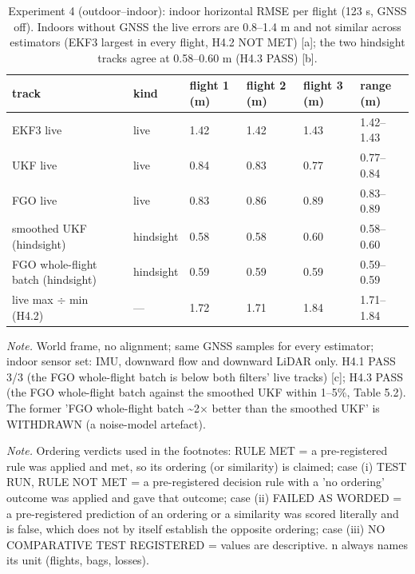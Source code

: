 \begin{table}[htbp]
\centering
\footnotesize
\caption{Experiment 4 (outdoor--indoor): indoor horizontal RMSE per flight (123 s, GNSS off). Indoors without GNSS the live errors are 0.8--1.4 m and not similar across estimators (EKF3 largest in every flight, H4.2 NOT MET) [a]; the two hindsight tracks agree at 0.58--0.60 m (H4.3 PASS) [b].}
\label{tab:T6}
\begin{tabular}{p{}p{}p{}p{}p{}p{}}
\toprule
\textbf{track} & \textbf{kind} & \textbf{flight 1 (m)} & \textbf{flight 2 (m)} & \textbf{flight 3 (m)} & \textbf{range (m)} \\
\midrule
EKF3 live & live & 1.42 & 1.42 & 1.43 & 1.42--1.43 \\
UKF live & live & 0.84 & 0.83 & 0.77 & 0.77--0.84 \\
FGO live & live & 0.83 & 0.86 & 0.89 & 0.83--0.89 \\
smoothed UKF (hindsight) & hindsight & 0.58 & 0.58 & 0.60 & 0.58--0.60 \\
FGO whole-flight batch (hindsight) & hindsight & 0.59 & 0.59 & 0.59 & 0.59--0.59 \\
live max $\div$ min (H4.2) & --- & 1.72 & 1.71 & 1.84 & 1.71--1.84 \\
\bottomrule
\end{tabular}
\par\smallskip\raggedright
\textit{Note.} World frame, no alignment; same GNSS samples for every estimator; indoor sensor set: IMU, downward flow and downward LiDAR only. H4.1 PASS 3/3 (the FGO whole-flight batch is below both filters' live tracks) [c]; H4.3 PASS (the FGO whole-flight batch against the smoothed UKF within 1--5\%, Table 5.2). The former 'FGO whole-flight batch \textasciitilde{}2$\times$ better than the smoothed UKF' is WITHDRAWN (a noise-model artefact).\par
\textit{Note.} Ordering verdicts used in the footnotes: RULE MET = a pre-registered rule was applied and met, so its ordering (or similarity) is claimed; case (i) TEST RUN, RULE NOT MET = a pre-registered decision rule with a 'no ordering' outcome was applied and gave that outcome; case (ii) FAILED AS WORDED = a pre-registered prediction of an ordering or a similarity was scored literally and is false, which does not by itself establish the opposite ordering; case (iii) NO COMPARATIVE TEST REGISTERED = values are descriptive. n always names its unit (flights, bags, losses).\par

\end{table}
